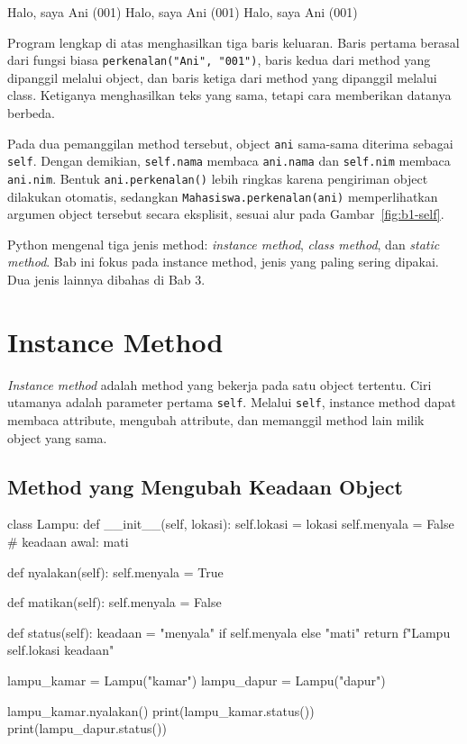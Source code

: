 \begin{keluaran}
Halo, saya Ani (001)
Halo, saya Ani (001)
Halo, saya Ani (001)
\end{keluaran}

Program lengkap di atas menghasilkan tiga baris keluaran. Baris pertama berasal dari fungsi biasa \texttt{perkenalan("Ani", "001")}, baris kedua dari method yang dipanggil melalui object, dan baris ketiga dari method yang dipanggil melalui class. Ketiganya menghasilkan teks yang sama, tetapi cara memberikan datanya berbeda.

Pada dua pemanggilan method tersebut, object \texttt{ani} sama-sama diterima sebagai \texttt{self}. Dengan demikian, \texttt{self.nama} membaca \texttt{ani.nama} dan \texttt{self.nim} membaca \texttt{ani.nim}. Bentuk \texttt{ani.perkenalan()} lebih ringkas karena pengiriman object dilakukan otomatis, sedangkan \texttt{Mahasiswa.perkenalan(ani)} memperlihatkan argumen object tersebut secara eksplisit, sesuai alur pada Gambar~\ref{fig:b1-self}.

\begin{info}
Python mengenal tiga jenis method: \emph{instance method}, \emph{class method}, dan \emph{static method}. Bab ini fokus pada instance method, jenis yang paling sering dipakai. Dua jenis lainnya dibahas di Bab 3.
\end{info}

\section{Instance Method}

\emph{Instance method} adalah method yang bekerja pada satu object tertentu. Ciri utamanya adalah parameter pertama \texttt{self}. Melalui \texttt{self}, instance method dapat membaca attribute, mengubah attribute, dan memanggil method lain milik object yang sama.

\subsection{Method yang Mengubah Keadaan Object}

\begin{kode}
class Lampu:
    def __init__(self, lokasi):
        self.lokasi = lokasi
        self.menyala = False           # keadaan awal: mati

    def nyalakan(self):
        self.menyala = True

    def matikan(self):
        self.menyala = False

    def status(self):
        keadaan = "menyala" if self.menyala else "mati"
        return f"Lampu {self.lokasi} {keadaan}"

lampu_kamar = Lampu("kamar")
lampu_dapur = Lampu("dapur")

lampu_kamar.nyalakan()
print(lampu_kamar.status())
print(lampu_dapur.status())
\end{kode}

